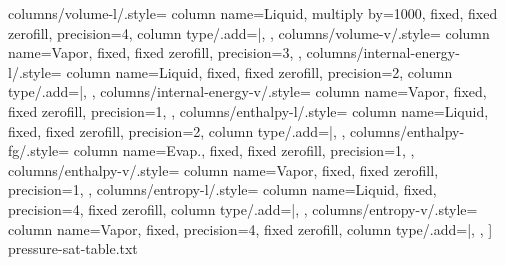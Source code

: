 \documentclass{article}
\begin{document}
\begin{center}
        columns/volume-l/.style={
            column name={Liquid},
            multiply by={1000},
            fixed,
            fixed zerofill,
            precision=4,
            column type/.add={|}{},
        },
        columns/volume-v/.style={
            column name={Vapor},
            fixed,
            fixed zerofill,
            precision=3,
        },
        columns/internal-energy-l/.style={
            column name={Liquid},
            fixed,
            fixed zerofill,
            precision=2,
            column type/.add={|}{},
        },
        columns/internal-energy-v/.style={
            column name={Vapor},
            fixed,
            fixed zerofill,
            precision=1,
        },
        columns/enthalpy-l/.style={
            column name={Liquid},
            fixed,
            fixed zerofill,
            precision=2,
            column type/.add={|}{},
        },
        columns/enthalpy-fg/.style={
            column name={Evap.},
            fixed,
            fixed zerofill,
            precision=1,
        },
        columns/enthalpy-v/.style={
            column name={Vapor},
            fixed,
            fixed zerofill,
            precision=1,
        },
        columns/entropy-l/.style={
            column name={Liquid},
            fixed,
            precision=4,
            fixed zerofill,
            column type/.add={|}{},
        },
        columns/entropy-v/.style={
            column name={Vapor},
            fixed,
            precision=4,
            fixed zerofill,
            column type/.add={}{|},
        },
    ]
    {pressure-sat-table.txt}


\end{center}
\end{document}
